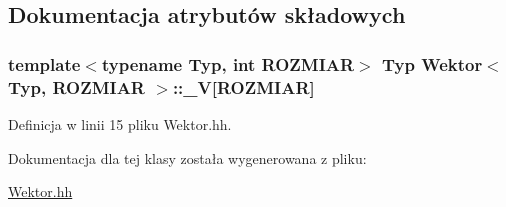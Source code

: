 \subsection{Dokumentacja atrybutów składowych}
\hypertarget{class_wektor_a0d996feb5ea3412a985abaac93060e4b}{
\subsubsection[{\_\-V}]{\setlength{\rightskip}{0pt plus 5cm}template$<$typename Typ, int ROZMIAR$>$ Typ {\bf Wektor}$<$ Typ, ROZMIAR $>$::{\bf \_\-V}\mbox{[}ROZMIAR\mbox{]}}}
\label{class_wektor_a0d996feb5ea3412a985abaac93060e4b}


Definicja w linii 15 pliku Wektor.hh.



Dokumentacja dla tej klasy została wygenerowana z pliku:\begin{DoxyCompactItemize}
\item 
\hyperlink{_wektor_8hh}{Wektor.hh}\end{DoxyCompactItemize}
